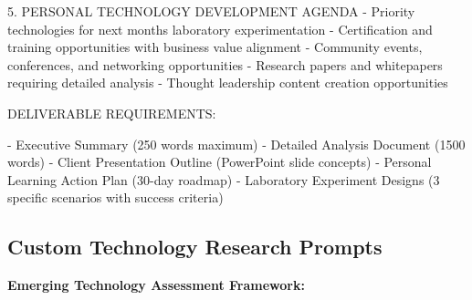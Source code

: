 \documentclass[
  letterpaper,
  DIV=11,
  numbers=noendperiod]{scrartcl}
\newenvironment{Shaded}{\begin{snugshade}}{\end{snugshade}}
\newcommand{\NormalTok}[1]{\textcolor[rgb]{0.00,0.23,0.31}{#1}}
\begin{document}
\begin{Shaded}
\begin{Highlighting}[]
\NormalTok{5. PERSONAL TECHNOLOGY DEVELOPMENT AGENDA}
\NormalTok{   {-} Priority technologies for next month\textquotesingle{}s laboratory experimentation}
\NormalTok{   {-} Certification and training opportunities with business value alignment}
\NormalTok{   {-} Community events, conferences, and networking opportunities}
\NormalTok{   {-} Research papers and whitepapers requiring detailed analysis}
\NormalTok{   {-} Thought leadership content creation opportunities}

\NormalTok{DELIVERABLE REQUIREMENTS:}

\NormalTok{{-} Executive Summary (250 words maximum)}
\NormalTok{{-} Detailed Analysis Document (1500 words)}
\NormalTok{{-} Client Presentation Outline (PowerPoint slide concepts)}
\NormalTok{{-} Personal Learning Action Plan (30{-}day roadmap)}
\NormalTok{{-} Laboratory Experiment Designs (3 specific scenarios with success criteria)}
\end{Highlighting}
\end{Shaded}

\subsection{Custom Technology Research
Prompts}\label{custom-technology-research-prompts}

\textbf{Emerging Technology Assessment Framework:}
\end{document}
